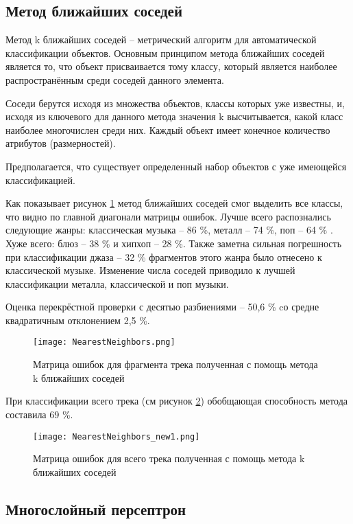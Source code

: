 \subsection{Метод ближайших соседей}

Метод k ближайших соседей -- метрический алгоритм для автоматической классификации объектов. Основным принципом метода ближайших соседей является то, что объект присваивается тому классу, который является наиболее распространённым среди соседей данного элемента.

Соседи берутся исходя из множества объектов, классы которых уже известны, и, исходя из ключевого для данного метода значения k высчитывается, какой класс наиболее многочислен среди них. Каждый объект имеет конечное количество атрибутов (размерностей).

Предполагается, что существует определенный набор объектов с уже имеющейся классификацией.

Как показывает рисунок \ref{fig:results:NearestNeighbors} метод ближайших соседей смог выделить все классы, что видно по главной диагонали матрицы ошибок. Лучше всего распознались следующие жанры: классическая музыка -- 86 \%, металл -- 74 \%, поп -- 64 \% . Хуже всего: блюз -- 38 \% и хипхоп -- 28 \%. Также заметна сильная погрешность при классификации  джаза -- 32 \% фрагментов этого жанра было отнесено к классической музыке. Изменение числа соседей приводило к лучшей классификации металла, классической и поп музыки. 

Оценка перекрёстной проверки с десятью разбиениями -- 50,6 \% cо средне квадратичным отклонением 2,5 \%.  

\begin{figure}[h]
\centering
  \texttt{[image: NearestNeighbors.png]}
  \caption{Матрица ошибок для фрагмента трека полученная с помощь метода k ближайших соседей}
  \label{fig:results:NearestNeighbors}
\end{figure}

При классификации всего трека (см рисунок \ref{fig:results:NearestNeighbors_new}) обобщающая способность метода составила 69 \%. 

\begin{figure}[h]
\centering
  \texttt{[image: NearestNeighbors\_new1.png]}
  \caption{Матрица ошибок  для всего трека  полученная с помощь метода k ближайших соседей}
  \label{fig:results:NearestNeighbors_new}
\end{figure}



\subsection{Многослойный персептрон}



